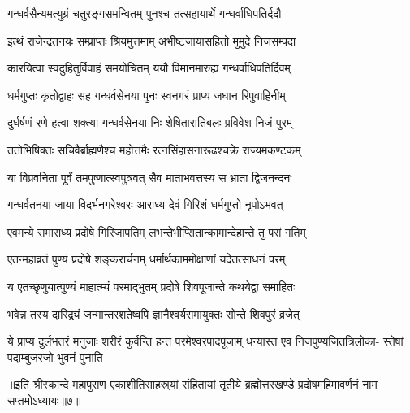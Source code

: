 \begin{center}
\twolineshloka
{गन्धर्वसैन्यमत्युग्रं चतुरङ्गसमन्वितम्}
{पुनश्च तत्सहायार्थे गन्धर्वाधिपतिर्ददौ} %

\twolineshloka
{इत्थं राजेन्द्रतनयः सम्प्राप्तः श्रियमुत्तमाम्}
{अभीष्टजायासहितो मुमुदे निजसम्पदा} %

\twolineshloka
{कारयित्वा स्वदुहितुर्विवाहं समयोचितम्}
{ययौ विमानमारुह्य गन्धर्वाधिपतिर्दिवम्} %

\twolineshloka
{धर्मगुप्तः कृतोद्वाहः सह गन्धर्वसेनया}
{पुनः स्वनगरं प्राप्य जघान रिपुवाहिनीम्} %

\twolineshloka
{दुर्धर्षणं रणे हत्वा शक्त्या गन्धर्वसेनया}
{निः शेषितारातिबलः प्रविवेश निजं पुरम्} %

\twolineshloka
{ततोभिषिक्तः सचिवैर्ब्राह्मणैश्च महोत्तमैः}
{रत्नसिंहासनारूढश्चक्रे राज्यमकण्टकम्} %

\twolineshloka
{या विप्रवनिता पूर्वं तमपुष्णात्स्वपुत्रवत्}
{सैव माताभवत्तस्य स भ्राता द्विजनन्दनः} %

\twolineshloka
{गन्धर्वतनया जाया विदर्भनगरेश्वरः}
{आराध्य देवं गिरिशं धर्मगुप्तो नृपोऽभवत्} %

\twolineshloka
{एवमन्ये समाराध्य प्रदोषे गिरिजापतिम्}
{लभन्तेभीप्सितान्कामान्देहान्ते तु परां गतिम्} %

\twolineshloka
{एतन्महाव्रतं पुण्यं प्रदोषे शङ्करार्चनम्}
{धर्मार्थकाममोक्षाणां यदेतत्साधनं परम्} %

\twolineshloka
{य एतच्छृणुयात्पुण्यं माहात्म्यं परमाद्भुतम्}
{प्रदोषे शिवपूजान्ते कथयेद्वा समाहितः} %

\twolineshloka
{भवेन्न तस्य दारिद्र्यं जन्मान्तरशतेष्वपि}
{ज्ञानैश्वर्यसमायुक्तः सोन्ते शिवपुरं व्रजेत्} %

\fourlineindentedshloka
{ये प्राप्य दुर्लभतरं मनुजाः शरीरं}
{कुर्वन्ति हन्त परमेश्वरपादपूजाम्}
{धन्यास्त एव निजपुण्यजितत्रिलोका-}
{स्तेषां पदाम्बुजरजो भुवनं पुनाति} %

{॥इति श्रीस्कान्दे महापुराण एकाशीतिसाहस्र्यां संहितायां तृतीये ब्रह्मोत्तरखण्डे प्रदोषमहिमावर्णनं नाम सप्तमोऽध्यायः॥७॥}

\hyperref[sec:pradosha_katha]{\closesub}

\end{center}
